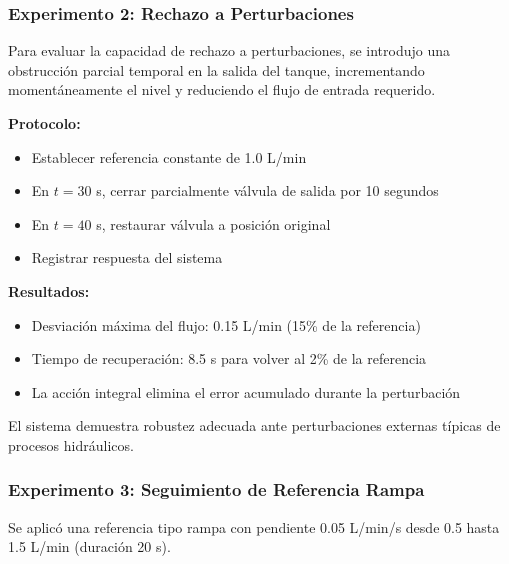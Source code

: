 \documentclass[conference]{IEEEtran}
\begin{document}

\subsubsection{Experimento 2: Rechazo a Perturbaciones}

Para evaluar la capacidad de rechazo a perturbaciones, se introdujo una obstrucción parcial temporal en la salida del tanque, incrementando momentáneamente el nivel y reduciendo el flujo de entrada requerido.

\textbf{Protocolo:}
\begin{itemize}
\item Establecer referencia constante de 1.0 L/min
\item En $t = 30$ s, cerrar parcialmente válvula de salida por 10 segundos
\item En $t = 40$ s, restaurar válvula a posición original
\item Registrar respuesta del sistema
\end{itemize}

\textbf{Resultados:}
\begin{itemize}
\item Desviación máxima del flujo: 0.15 L/min (15\% de la referencia)
\item Tiempo de recuperación: 8.5 s para volver al 2\% de la referencia
\item La acción integral elimina el error acumulado durante la perturbación
\end{itemize}

El sistema demuestra robustez adecuada ante perturbaciones externas típicas de procesos hidráulicos.

\subsubsection{Experimento 3: Seguimiento de Referencia Rampa}

Se aplicó una referencia tipo rampa con pendiente 0.05 L/min/s desde 0.5 hasta 1.5 L/min (duración 20 s).
\end{document}
